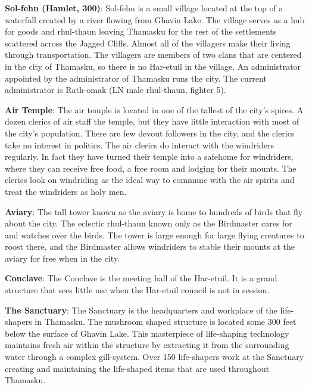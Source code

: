 {
	\textbf{Sol-fehn (Hamlet, 300)}: Sol-fehn is a small village located at the top of a waterfall created by a river flowing from Ghavin Lake. The village serves as a hub for goods and rhul-thaun leaving Thamasku for the rest of the settlements scattered across the Jagged Cliffs. Almost all of the villagers make their living through transportation. The villagers are members of two clans that are centered in the city of Thamasku, so there is no Har-etuil in the village. An administrator appointed by the administrator of Thamasku runs the city. The current administrator is Rath-omak (LN male rhul-thaun, fighter 5).
}
{
	\textbf{Air Temple}: The air temple is located in one of the tallest of the city's spires. A dozen clerics of air staff the temple, but they have little interaction with most of the city's population. There are few devout followers in the city, and the clerics take no interest in politics. The air clerics do interact with the windriders regularly. In fact they have turned their temple into a safehome for windriders, where they can receive free food, a free room and lodging for their mounts. The clerics look on windriding as the ideal way to commune with the air spirits and treat the windriders as holy men.

	\textbf{Aviary}: The tall tower known as the aviary is home to hundreds of birds that fly about the city. The eclectic rhul-thaun known only as the Birdmaster cares for and watches over the birds. The tower is large enough for large flying creatures to roost there, and the Birdmaster allows windriders to stable their mounts at the aviary for free when in the city.

	\textbf{Conclave}: The Conclave is the meeting hall of the Har-etuil. It is a grand structure that sees little use when the Har-etuil council is not in session.

	\textbf{The Sanctuary}: The Sanctuary is the headquarters and workplace of the life-shapers in Thamasku. The mushroom shaped structure is located some 300 feet below the surface of Ghavin Lake. This masterpiece of life-shaping technology maintains fresh air within the structure by extracting it from the surrounding water through a complex gill-system. Over 150 life-shapers work at the Sanctuary creating and maintaining the life-shaped items that are used throughout Thamasku.
}
